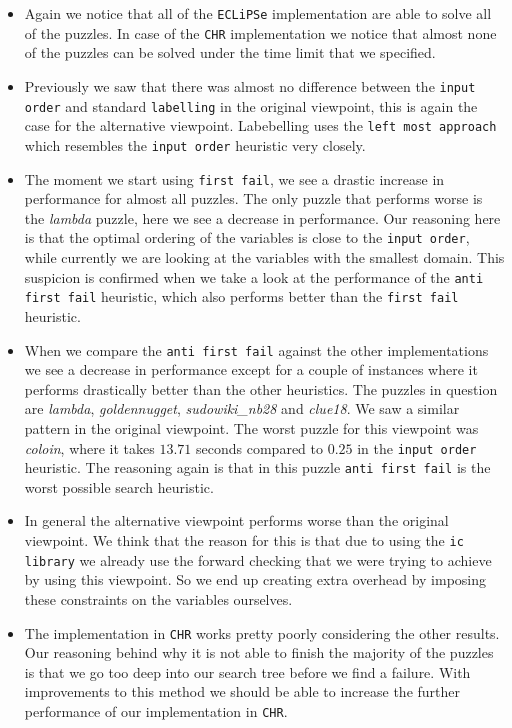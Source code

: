\begin{itemize} %
\item Again we notice that all of the \texttt{ECLiPSe} implementation are able to solve all of the puzzles. In case of the \texttt{CHR} implementation we notice that almost none of the puzzles can be solved under the time limit that we specified.
\item Previously we saw that there was almost no difference between the \texttt{input order} and standard \texttt{labelling} in the original viewpoint, this is again the case for the alternative viewpoint. Labebelling uses the \texttt{left most approach} which resembles the \texttt{input order} heuristic very closely.
\item The moment we start using \texttt{first fail}, we see a drastic increase in performance for almost all puzzles. The only puzzle that performs worse is the \textit{lambda} puzzle, here we see a decrease in performance. Our reasoning here is that the optimal ordering of the variables is close to the \texttt{input order}, while currently we are looking at the variables with the smallest domain. This suspicion is confirmed when we take a look at the performance of the \texttt{anti first fail} heuristic, which also performs better than the \texttt{first fail} heuristic.
\item When we compare the \texttt{anti first fail} against the other implementations we see a decrease in performance except for a couple of instances where it performs drastically better than the other heuristics. The puzzles in question are \textit{lambda}, \textit{goldennugget}, \textit{sudowiki\_nb28} and \textit{clue18}. We saw a similar pattern in the original viewpoint. The worst puzzle for this viewpoint was \textit{coloin}, where it takes $13.71$ seconds compared to $0.25$ in the \texttt{input order} heuristic. The reasoning again is that in this puzzle \texttt{anti first fail} is the worst possible search heuristic.
\item In general the alternative viewpoint performs worse than the original viewpoint. We think that the reason for this is that due to using the \texttt{ic library} we already use the forward checking that we were trying to achieve by using this viewpoint. So we end up creating extra overhead by imposing these constraints on the variables ourselves. 
\item The implementation in \texttt{CHR} works pretty poorly considering the other results. Our reasoning behind why it is not able to finish the majority of the puzzles is that we go too deep into our search tree before we find a failure. With improvements to this method we should be able to increase the further performance of our implementation in \texttt{CHR}.
\end{itemize}

